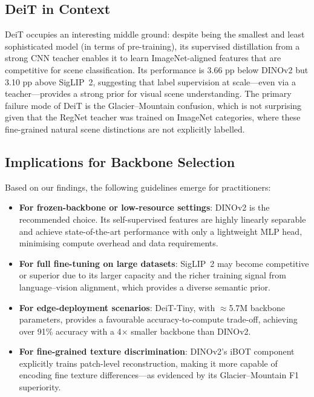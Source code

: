 \documentclass[journal]{IEEEtran}
\begin{document}
\subsection{DeiT in Context}
DeiT occupies an interesting middle ground: despite being the smallest and least
sophisticated model (in terms of pre-training), its supervised distillation from
a strong CNN teacher enables it to learn ImageNet-aligned features that are competitive
for scene classification. Its performance is 3.66 pp below DINOv2 but 3.10 pp above
SigLIP~2, suggesting that label supervision at scale—even via a teacher—provides a
strong prior for visual scene understanding. The primary failure mode of DeiT is the
Glacier–Mountain confusion, which is not surprising given that the RegNet teacher was
trained on ImageNet categories, where these fine-grained natural scene distinctions are
not explicitly labelled.

\subsection{Implications for Backbone Selection}
Based on our findings, the following guidelines emerge for practitioners:

\begin{itemize}
    \item \textbf{For frozen-backbone or low-resource settings}: DINOv2 is the recommended
    choice. Its self-supervised features are highly linearly separable and achieve
    state-of-the-art performance with only a lightweight MLP head, minimising compute
    overhead and data requirements.

    \item \textbf{For full fine-tuning on large datasets}: SigLIP~2 may become competitive
    or superior due to its larger capacity and the richer training signal from
    language–vision alignment, which provides a diverse semantic prior.

    \item \textbf{For edge-deployment scenarios}: DeiT-Tiny, with $\approx$5.7M backbone
    parameters, provides a favourable accuracy-to-compute trade-off, achieving over 91\%
    accuracy with a 4$\times$ smaller backbone than DINOv2.

    \item \textbf{For fine-grained texture discrimination}: DINOv2's iBOT component
    explicitly trains patch-level reconstruction, making it more capable of encoding
    fine texture differences—as evidenced by its Glacier–Mountain F1 superiority.
\end{itemize}
\end{document}
